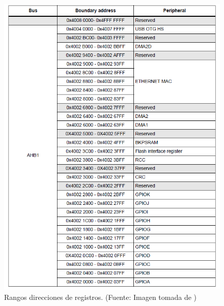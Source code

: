 \begin{figure}[H]
\centering
\includegraphics[scale=0.8]{./Figuras/Nota_teorica/REGS1}
\caption{Rangos direcciones de registros. (Fuente: Imagen tomada de \cite{ST})}
\label{fig:REGS1}
\end{figure}


